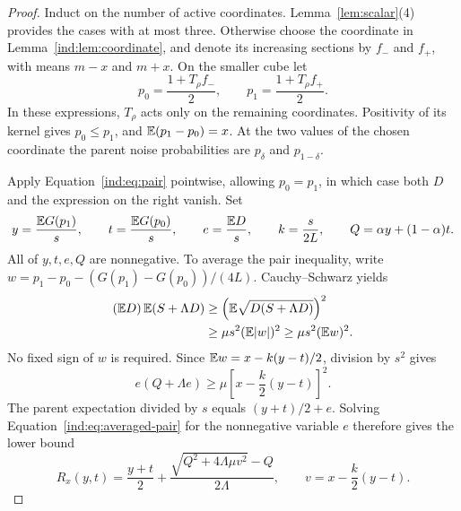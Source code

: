 \begin{proof}
Induct on the number of active coordinates.  Lemma~\ref{lem:scalar}(4)
provides the cases with at most three.  Otherwise choose the coordinate
in Lemma~\ref{ind:lem:coordinate}, and denote its increasing sections by
$f_-$ and $f_+$, with means $m-x$ and $m+x$.  On the smaller cube let
\[
 p_0=\frac{1+T_\rho f_-}{2},\qquad
 p_1=\frac{1+T_\rho f_+}{2}.
\]
In these expressions, $T_\rho$ acts only on the remaining coordinates.  Positivity of its kernel gives $p_0\le p_1$, and
$\mathbb E(p_1-p_0)=x$.  At the two values of the chosen coordinate the parent
noise probabilities are $p_\delta$ and $p_{1-\delta}$.

Apply Equation~\eqref{ind:eq:pair} pointwise, allowing $p_0=p_1$, in
which case both $D$ and the expression on the right vanish.  Set
\[
 y=\frac{\mathbb E G(p_1)}s,\qquad t=\frac{\mathbb E G(p_0)}s,\qquad
 e=\frac{\mathbb E D}s,\qquad k=\frac{s}{2L},\qquad
 Q=\alpha y+(1-\alpha)t.
\]
All of $y,t,e,Q$ are nonnegative.  To average the pair inequality, write
$w=p_1-p_0-(G(p_1)-G(p_0))/(4L)$.  Cauchy--Schwarz yields
\[
 \begin{split}
 (\mathbb E D)\,\mathbb E(S+\Lambda D)
 &\ge\left(\mathbb E\sqrt{D(S+\Lambda D)}\right)^2\\
 &\ge\mu s^2(\mathbb E|w|)^2
 \ge\mu s^2(\mathbb E w)^2.
 \end{split}
\]
No fixed sign of $w$ is required.  Since
$\mathbb E w=x-k(y-t)/2$, division by $s^2$ gives
\begin{equation}\label{ind:eq:averaged-pair}
 e(Q+\Lambda e)\ge\mu\left[x-\frac{k}{2}(y-t)\right]^2.
\end{equation}
The parent expectation divided by $s$ equals $(y+t)/2+e$.  Solving
Equation~\eqref{ind:eq:averaged-pair} for the nonnegative variable $e$
therefore gives the lower bound
\begin{equation}\label{ind:eq:R}
 R_x(y,t)=\frac{y+t}{2}+
 \frac{\sqrt{Q^2+4\Lambda\mu v^2}-Q}{2\Lambda},
 \qquad v=x-\frac{k}{2}(y-t).
\end{equation}


\end{proof}
